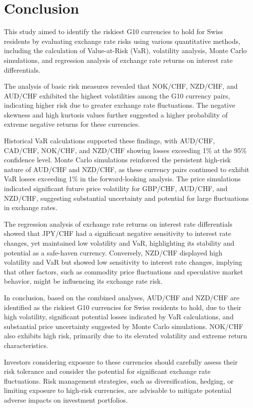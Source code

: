 \documentclass{article}
\begin{document}
\section{Conclusion}

This study aimed to identify the riskiest G10 currencies to hold for Swiss residents by evaluating exchange rate risks using various quantitative methods, including the calculation of Value-at-Risk (VaR), volatility analysis, Monte Carlo simulations, and regression analysis of exchange rate returns on interest rate differentials.

The analysis of basic risk measures revealed that NOK/CHF, NZD/CHF, and AUD/CHF exhibited the highest volatilities among the G10 currency pairs, indicating higher risk due to greater exchange rate fluctuations. The negative skewness and high kurtosis values further suggested a higher probability of extreme negative returns for these currencies.

Historical VaR calculations supported these findings, with AUD/CHF, CAD/CHF, NOK/CHF, and NZD/CHF showing losses exceeding 1\% at the 95\% confidence level. Monte Carlo simulations reinforced the persistent high-risk nature of AUD/CHF and NZD/CHF, as these currency pairs continued to exhibit VaR losses exceeding 1\% in the forward-looking analysis. The price simulations indicated significant future price volatility for GBP/CHF, AUD/CHF, and NZD/CHF, suggesting substantial uncertainty and potential for large fluctuations in exchange rates.

The regression analysis of exchange rate returns on interest rate differentials showed that JPY/CHF had a significant negative sensitivity to interest rate changes, yet maintained low volatility and VaR, highlighting its stability and potential as a safe-haven currency. Conversely, NZD/CHF displayed high volatility and VaR but showed low sensitivity to interest rate changes, implying that other factors, such as commodity price fluctuations and speculative market behavior, might be influencing its exchange rate risk.

In conclusion, based on the combined analyses, AUD/CHF and NZD/CHF are identified as the riskiest G10 currencies for Swiss residents to hold, due to their high volatility, significant potential losses indicated by VaR calculations, and substantial price uncertainty suggested by Monte Carlo simulations. NOK/CHF also exhibits high risk, primarily due to its elevated volatility and extreme return characteristics.

Investors considering exposure to these currencies should carefully assess their risk tolerance and consider the potential for significant exchange rate fluctuations. Risk management strategies, such as diversification, hedging, or limiting exposure to high-risk currencies, are advisable to mitigate potential adverse impacts on investment portfolios.
\end{document}
